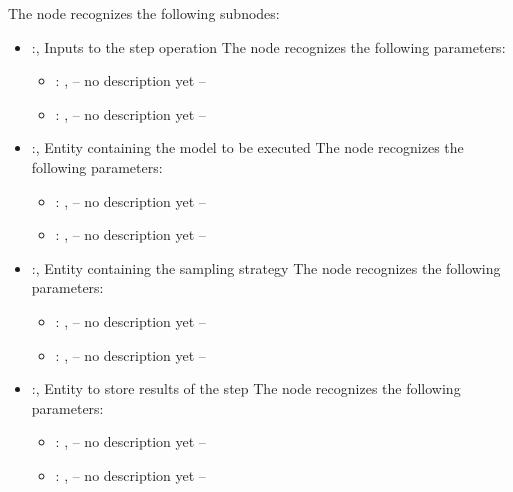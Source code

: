   The  node recognizes the following subnodes:
  \begin{itemize}
    \item {}:, 
      Inputs to the step operation
      The  node recognizes the following parameters:
        \begin{itemize}
          \item {}: , 
            -- no description yet --
          \item {}: , 
            -- no description yet --
      \end{itemize}

    \item {}:, 
      Entity containing the model to be executed
      The  node recognizes the following parameters:
        \begin{itemize}
          \item {}: , 
            -- no description yet --
          \item {}: , 
            -- no description yet --
      \end{itemize}

    \item {}:, 
      Entity containing the sampling strategy
      The  node recognizes the following parameters:
        \begin{itemize}
          \item {}: , 
            -- no description yet --
          \item {}: , 
            -- no description yet --
      \end{itemize}

    \item {}:, 
      Entity to store results of the step
      The  node recognizes the following parameters:
        \begin{itemize}
          \item {}: , 
            -- no description yet --
          \item {}: , 
            -- no description yet --
      \end{itemize}


\end{itemize}
